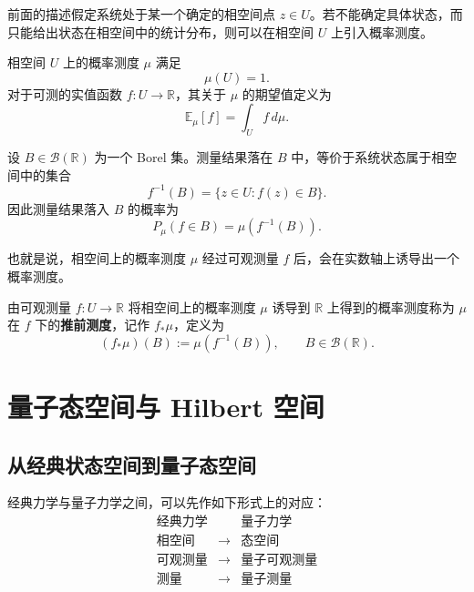\documentclass[UTF8,a4paper,11pt,openany]{ctexbook}
\begin{document}
前面的描述假定系统处于某一个确定的相空间点 $z\in U$。若不能确定具体状态，而只能给出状态在相空间中的统计分布，则可以在相空间 $U$ 上引入概率测度。

\begin{definition}[相空间上的概率测度]
相空间 $U$ 上的概率测度 $\mu$ 满足
\begin{equation}
    \mu(U)=1.
\end{equation}
对于可测的实值函数 $f:U\to\mathbb R$，其关于 $\mu$ 的期望值定义为
\begin{equation}
    \mathbb E_\mu[f]
    =
    \int_U f\,d\mu.
\end{equation}
\end{definition}

设 $B\in\mathcal B(\mathbb R)$ 为一个 Borel 集。测量结果落在 $B$ 中，等价于系统状态属于相空间中的集合
\begin{equation}
    f^{-1}(B)
    =
    \{z\in U:f(z)\in B\}.
\end{equation}
因此测量结果落入 $B$ 的概率为
\begin{equation}
    P_\mu(f\in B)
    =
    \mu\!\left(f^{-1}(B)\right).
\end{equation}

也就是说，相空间上的概率测度 $\mu$ 经过可观测量 $f$ 后，会在实数轴上诱导出一个概率测度。

\begin{definition}[推前测度]
由可观测量 $f:U\to\mathbb R$ 将相空间上的概率测度 $\mu$ 诱导到 $\mathbb R$ 上得到的概率测度称为 $\mu$ 在 $f$ 下的\textbf{推前测度}，记作 $f_*\mu$，定义为
\begin{equation}
    (f_*\mu)(B)
    :=
    \mu\!\left(f^{-1}(B)\right),
    \qquad
    B\in\mathcal B(\mathbb R).
\end{equation}
\end{definition}

\section{量子态空间与 Hilbert 空间}

\subsection{从经典状态空间到量子态空间}

经典力学与量子力学之间，可以先作如下形式上的对应：
\[
\begin{array}{ccc}
\text{经典力学} && \text{量子力学} \\[1mm]
\text{相空间} & \longrightarrow & \text{态空间} \\
\text{可观测量} & \longrightarrow & \text{量子可观测量} \\
\text{测量} & \longrightarrow & \text{量子测量}
\end{array}
\]
\end{document}
